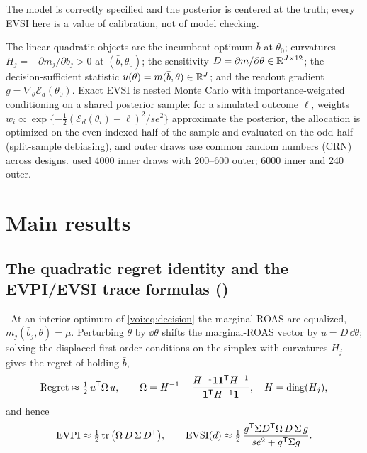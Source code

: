\begin{assumption}
\label{voi:ass:spec}
The model is correctly specified and the posterior is centered at the truth; every EVSI here is a value of calibration, not of model checking.
\end{assumption}

The linear-quadratic objects are the incumbent optimum $\bar b$ at $\theta_0$; curvatures $H_j = -\partial m_j/\partial b_j > 0$ at $(\bar b,\theta_0)$; the sensitivity $D = \partial m/\partial\theta \in \mathbb{R}^{J\times 12}$; the decision-sufficient statistic $u(\theta) = m(\bar b,\theta) \in \mathbb{R}^J$; and the readout gradient $g = \nabla_\theta\mathcal E_d(\theta_0)$. Exact EVSI is nested Monte Carlo with importance-weighted conditioning on a shared posterior sample: for a simulated outcome $\ell$, weights $w_i \propto \exp\{-\tfrac12(\mathcal E_d(\theta_i) - \ell)^2/se^2\}$ approximate the posterior, the allocation is optimized on the even-indexed half of the sample and evaluated on the odd half (split-sample debiasing), and outer draws use common random numbers (CRN) across designs.  used 4000 inner draws with 200--600 outer;  6000 inner and 240 outer.

\section{Main results}

\subsection{The quadratic regret identity and the EVPI/EVSI trace formulas ()}

\begin{proposition}
\label{voi:prop:lq}
\tagEstablished\ At an interior optimum of \cref{voi:eq:decision} the marginal ROAS are equalized, $m_j(\bar b_j,\theta) = \mu$. Perturbing $\theta$ by $\dd\theta$ shifts the marginal-ROAS vector by $u = D\,\dd\theta$; solving the displaced first-order conditions on the simplex with curvatures $H_j$ gives the regret of holding $\bar b$,
\begin{equation}
\mathrm{Regret} \approx \tfrac12\, u^{\mathsf{T}} \Omega\, u, \qquad \Omega = H^{-1} - \frac{H^{-1}\mathbf{1}\mathbf{1}^{\mathsf{T}} H^{-1}}{\mathbf{1}^{\mathsf{T}} H^{-1}\mathbf{1}}, \quad H = \operatorname{diag}(H_j),
\label{voi:eq:omega}
\end{equation}
and hence
\begin{equation}
\mathrm{EVPI} \approx \tfrac12 \operatorname{tr}\big(\Omega\, D\,\Sigma\, D^{\mathsf{T}}\big), \qquad
\mathrm{EVSI}(d) \approx \tfrac12\, \frac{g^{\mathsf{T}} \Sigma D^{\mathsf{T}} \Omega\, D\, \Sigma\, g}{se^2 + g^{\mathsf{T}} \Sigma g}.
\label{voi:eq:trace}
\end{equation}
\end{proposition}

